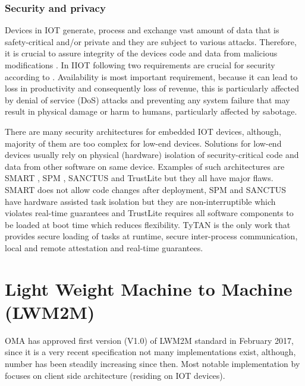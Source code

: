\subsubsection{Security and privacy}

Devices in IOT generate, process and exchange vast amount of data that is safety-critical and/or private and they are subject to various attacks. Therefore, it is crucial to assure integrity of the devices code and data from malicious modifications \cite{Control2014}. In IIOT following two requirements are crucial for security according to \cite{Sadeghi2015}. Availability is most important requirement, because it can lead to loss in productivity and consequently loss of revenue, this is particularly affected by denial of service (DoS) attacks and preventing any system failure that may result in physical damage or harm to humans, particularly affected by sabotage.

There are many security architectures for embedded IOT devices, although, majority of them are too complex for low-end devices. Solutions for low-end devices usually rely on physical (hardware) isolation of security-critical code and data from other software on same device. Examples of such architectures are SMART \cite{Smart}, SPM \cite{SPM}, SANCTUS \cite{Sanctus} and TrustLite \cite{TrustLite} but they all have major flaws. SMART does not allow code changes after deployment, SPM and SANCTUS have hardware assisted task isolation but they are non-interruptible which violates real-time guarantees and TrustLite requires all software components to be loaded at boot time which reduces flexibility. TyTAN \cite{Brasser} is the only work that provides secure loading of tasks at runtime, secure inter-process communication, local and remote attestation and real-time guarantees. 

\section{Light Weight Machine to Machine (LWM2M)}
\label{section:LWM2M}

OMA has approved first version (V1.0) of LWM2M standard in February 2017, since it is a very recent specification not many implementations exist, although, number has been steadily increasing since then. Most notable implementation by \cite{Rao2015} focuses on client side architecture (residing on IOT devices).


